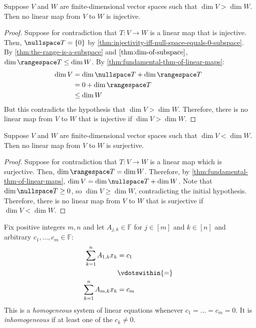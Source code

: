 \documentclass{article}
\begin{document}
\begin{theorem}
  \label{thm:linear-map-to-lower-dimensional-space-not-injective}
  Suppose $V$ and $W$ are finite-dimensional vector spaces such that
  $\dim V > \dim W$. Then no linear map from $V$ to $W$ is injective.
\end{theorem}
\begin{proof}
  Suppose for contradiction that $T: V \rightarrow W$ is a linear map
  that is injective. Then, $\nullspace T = \{0\}$ by
  \cref{thm:injectivity-iff-null-space-equals-0-subspace}. By
  \cref{thm:the-range-is-a-subspace} and $\cref{thm:dim-of-subspace}$,
  $\dim \rangespace T \le \dim W$. By
  \cref{thm:fundamental-thm-of-linear-maps}:
  \begin{align*}
    \dim V &= \dim \nullspace T + \dim \rangespace T \\
           &= 0 + \dim \rangespace T \\
           &\le \dim W \\
  \end{align*}
  But this contradicts the hypothesis that $\dim V > \dim
  W$. Therefore, there is no linear map from $V$ to $W$ that is
  injective if $\dim V > \dim W$.
\end{proof}

\begin{theorem}
  \label{thm:linear-map-to-higher-dimensional-space-not-surjective}
  Suppose $V$ and $W$ are finite-dimensional vector spaces such that
  $\dim V < \dim W$. Then no linear map from $V$ to $W$ is surjective.
\end{theorem}
\begin{proof}
  Suppose for contradiction that $T: V \rightarrow W$ is a linear map which is
  surjective. Then, $\dim \rangespace T = \dim W$. Therefore, by
  \cref{thm:fundamental-thm-of-linear-maps}, $\dim V = \dim \nullspace
  T + \dim W$. Note that $\dim \nullspace T \ge 0$, so $\dim V \ge
  \dim W$, contradicting the initial hypothesis. Therefore, there is
  no linear map from $V$ to $W$ that is surjective if $\dim V < \dim W$.
\end{proof}

\begin{definition}
  \label{def:system-of-linear-equations}
  Fix positive integers $m, n$ and let $A_{j, k} \in \mathbb{F}$ for $j \in [m]$ and
  $k \in [n]$ and arbitrary $c_1, ..., c_m \in \mathbb{F}$:
  \begin{align*}
    \sum_{k=1}^n A_{1, k}x_k &= c_1 \\
    &\vdotswithin{=} \notag \\
    \sum_{k=1}^nA_{m, k}x_k &= c_m \\
  \end{align*}
  This is a \textit{homogeneous} system of linear equations whenever
  $c_1 = ... = c_m = 0$. It is
  \textit{inhomogeneous} if at least one of the $c_k \ne 0$.
\end{definition}
\end{document}
